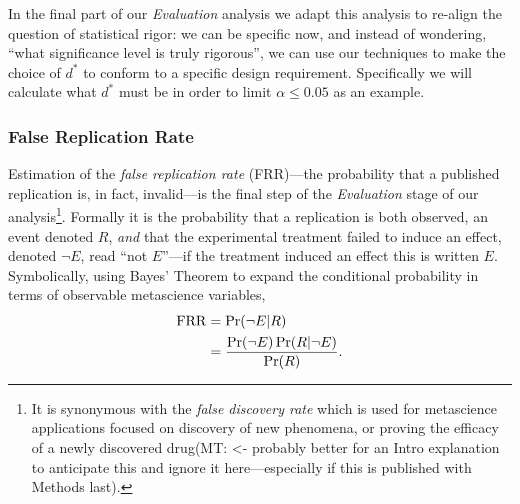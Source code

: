 \documentclass[preview]{article}
\newcommand{\mt}[1]{{\textcolor{myorange} {({\tiny MT:} #1)}}}
\begin{document}
In the final part of our \emph{Evaluation} analysis we adapt this
analysis to re-align the question of statistical rigor: we can be
specific now, and instead of wondering, ``what significance level is
truly rigorous'', we can use our techniques to make the choice of
$d^*$ to conform to a specific design requirement. Specifically we
will calculate what $d^*$ must be in order to limit
$\alpha \leq 0.05$ as an example.


\subsubsection{False Replication Rate}\label{false-discovery-rate}


Estimation of the \emph{false replication rate} (FRR)—the probability that a published 
replication is, in fact, invalid—is the final step of the \emph{Evaluation} stage
of our analysis\footnote{It is synonymous with the \emph{false discovery rate}
which is used for metascience applications focused on discovery of new phenomena,
or proving the efficacy of a newly discovered drug\mt{<- probably better for an
Intro explanation to anticipate this and ignore it here—especially if this is
published with Methods last}.}. 
Formally it is the probability that a replication
is both observed, an event denoted $R$, \emph{and} that the experimental treatment
failed to induce an effect, denoted $\neg E$, read ``not $E$''—if the treatment
induced an effect this is written $E$. Symbolically, using Bayes' Theorem to
expand the conditional probability in terms of observable metascience variables,
\begin{align}
  \mathrm{FRR} & =  \Pr(\neg E | R) \notag \\
               & =  \frac{\Pr(\neg E)\Pr(R|\neg E)}{\Pr(R)}.\label{eq:FRR-condprob-bayes}
\end{align}
\end{document}
